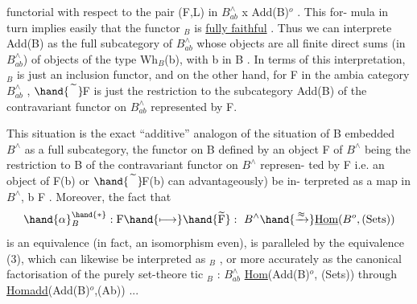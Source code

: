 
functorial with respect to the pair (F,L) in  $B^{\wedge}_{ab}$ x Add(B)$^{o}$ .  This for-%
mula in turn implies easily that the functor \hand{$\gamma$}$_{B}$ is \uline{fully faithful} .
Thus we can interprete Add(B) as the full subcategory of $B^{\wedge}_{ab}$  
whose objects are all finite direct sums (in $B^{\wedge}_{ab}$) of objects of the
type Wh$_{B}$(b),  with b in B .  In terms of this interpretation, \hand{$\gamma$}$_{B}$  is
just an inclusion functor,  and on the other hand,  for F in the ambia
category $B^{\wedge}_{ab}$ ,  $\hand{\widetilde{\phantom{F}}}\!$F  is just the restriction to the subcategory Add(B)
of the contravariant functor on $B^{\wedge}_{ab}$  represented by F. \hand{$\|$}

This situation
is the exact ``additive'' analogon of the situation of B embedded  $B^{\wedge}$
as a full subcategory,  the functor on B defined by an object F of $B^{\wedge}$
being the restriction to B of the contravariant functor on $B^{\wedge}$ represen-%
ted by F\hand{,} i.e. an object of F(b) or $\hand{\widetilde{\phantom{F}}}\!$F(b) can  advantageously) be in-%
terpreted as a map in $B^{\wedge}$,  b \hand{$\longrightarrow$} F .  Moreover,  the fact that  \hand{$\sim$}
\[ \hand{\alpha}^{\hand{*}}_{B} : \text{F} \hand{\longmapsto} \hand{\widetilde{\text{F}}} :\ B^{\wedge} \hand{\xrightarrow{\approx}} \underline{\text{Hom}}(B^{o},(\text{Sets})) \]
is an equivalence (in fact,  an isomorphism even),  is paralleled by
the equivalence (3),  which can likewise be interpreted as \hand{$\gamma^{*}$}$_{B}$ ,  or
more accurately as the canonical factorisation of the purely set-theore%
tic \hand{$\gamma^{*}$}$_{B}$ : $B^{\wedge}_{ab}$ \hand{$\longrightarrow$} \uline{Hom}(Add(B)$^{o}$, (Sets)) through \uline{Homadd}(Add(B)$^{o}$,(Ab)) ...

